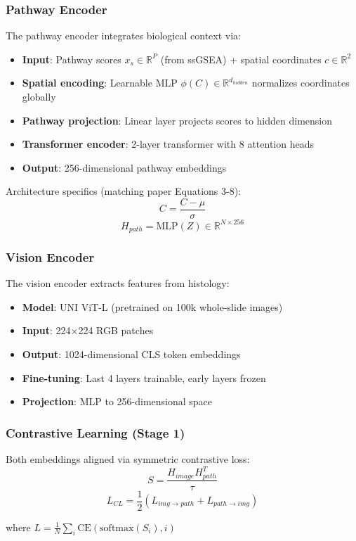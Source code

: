 \documentclass[conference]{IEEEtran}
\begin{document}
\subsubsection{Pathway Encoder}
The pathway encoder integrates biological context via:
\begin{itemize}
\item \textbf{Input}: Pathway scores $x_s \in \mathbb{R}^P$ (from ssGSEA) + spatial coordinates $c \in \mathbb{R}^2$
\item \textbf{Spatial encoding}: Learnable MLP $\phi(C) \in \mathbb{R}^{d_{hidden}}$ normalizes coordinates globally
\item \textbf{Pathway projection}: Linear layer projects scores to hidden dimension
\item \textbf{Transformer encoder}: 2-layer transformer with 8 attention heads
\item \textbf{Output}: 256-dimensional pathway embeddings
\end{itemize}

Architecture specifics (matching paper Equations 3-8):
$$C = \frac{C - \mu}{\sigma}$$
$$H_{path} = \text{MLP}(Z) \in \mathbb{R}^{N \times 256}$$

\subsubsection{Vision Encoder}
The vision encoder extracts features from histology:
\begin{itemize}
\item \textbf{Model}: UNI ViT-L (pretrained on 100k whole-slide images)
\item \textbf{Input}: 224×224 RGB patches
\item \textbf{Output}: 1024-dimensional CLS token embeddings
\item \textbf{Fine-tuning}: Last 4 layers trainable, early layers frozen
\item \textbf{Projection}: MLP to 256-dimensional space
\end{itemize}

\subsubsection{Contrastive Learning (Stage 1)}
Both embeddings aligned via symmetric contrastive loss:
$$S = \frac{H_{image} H_{path}^T}{\tau}$$
$$L_{CL} = \frac{1}{2}(L_{img \to path} + L_{path \to img})$$

where $L = \frac{1}{N}\sum_i \text{CE}(\text{softmax}(S_i), i)$
\end{document}
